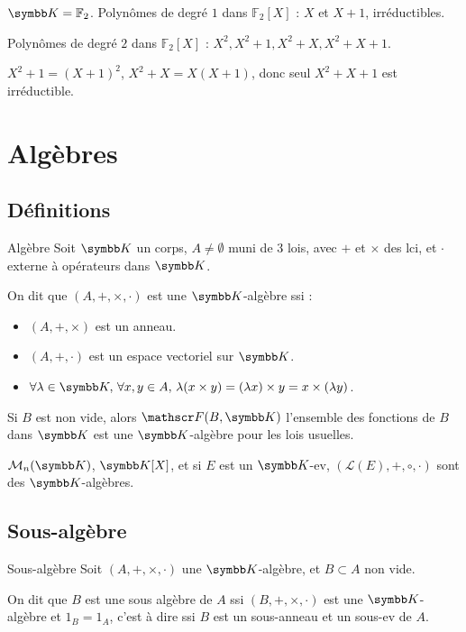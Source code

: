 \begin{exemple}
    $\K = \mathbb F_2$. Polynômes de degré $1$ dans $\mathbb F_2[X]$ : $X$ et $X + 1$, irréductibles.

    Polynômes de degré $2$ dans $\mathbb F_2[X]$ : $X^2, X^2 + 1, X^2 + X, X^2 + X + 1$.

    $X^2 + 1 = (X + 1)^2$, $X^2 + X = X(X + 1)$, donc seul $X^2 + X + 1$ est irréductible.
\end{exemple}

\section{Algèbres} 
\subsection{Définitions}

\begin{definition}{Algèbre}{}
    Soit $\K$ un corps, $A \neq \emptyset$ muni de 3 lois, avec $+$ et $\times$ des lci, 
    et $\cdot$ externe à opérateurs dans $\K$.

    On dit que $(A, +, \times, \cdot)$ est une $\K$-algèbre ssi :
    \begin{itemize}
        \item $(A, +, \times)$ est un anneau.
        \item $(A, +, \cdot)$ est un espace vectoriel sur $\K$.
        \item $\forall \lambda \in \K, \, \forall x, y \in A, \, \lambda (x \times y) = (\lambda x) \times y = x \times (\lambda y)$.
    \end{itemize}

\end{definition}

\begin{exemple}
    Si $B$ est non vide, alors $\mathscr F(B, \K)$ l'ensemble des fonctions de $B$ dans $\K$ est une $\K$-algèbre
    pour les lois usuelles.

    $\mathcal M_n(\K)$, $\K[X]$, et si $E$ est un $\K$-ev, $(\mathcal L(E), +, \circ, \cdot)$ sont des $\K$-algèbres.
\end{exemple}

\subsection{Sous-algèbre}

\begin{definition}{Sous-algèbre}{}
    Soit $(A, +, \times, \cdot)$ une $\K$-algèbre, et $B \subset A$ non vide. 

    On dit que $B$ est une sous algèbre de $A$ ssi $(B, +, \times, \cdot)$ est une $\K$-algèbre 
    et $1_B = 1_A$, c'est à dire ssi $B$ est un sous-anneau et un sous-ev de $A$.
\end{definition}

